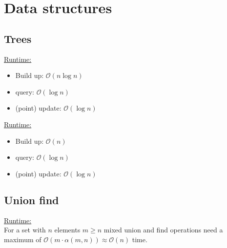 \section{Data structures}

\subsection{Trees}

\underline{Runtime:}
\begin{itemize}
\item Build up: $\mathcal{O}(n\log n)$
\item query: $\mathcal{O}(\log n)$
\item (point) update: $\mathcal{O}(\log n)$
\end{itemize}


\underline{Runtime:}
\begin{itemize}
\item Build up: $\mathcal{O}(n)$
\item query: $\mathcal{O}(\log n)$
\item (point) update: $\mathcal{O}(\log n)$
\end{itemize}

\subsection{Union find}
\underline{Runtime:}\\
For a set with $n$ elements $m \geq n$ mixed union and find operations need a maximum of $\mathcal{O}(m \cdot \alpha(m, n)) \approx \mathcal{O}(n)$ time.

